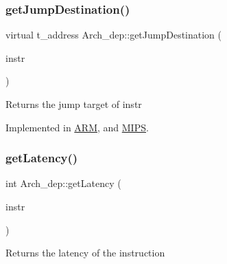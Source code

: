 \subsubsection{\texorpdfstring{get\+Jump\+Destination()}{getJumpDestination()}}
{\footnotesize\ttfamily virtual t\+\_\+address Arch\+\_\+dep\+::get\+Jump\+Destination (\begin{DoxyParamCaption}\item[{const \hyperlink{classObjdumpInstruction}{Objdump\+Instruction} \&}]{instr }\end{DoxyParamCaption})\hspace{0.3cm}{\ttfamily [pure virtual]}}

Returns the jump target of instr 

Implemented in \hyperlink{classARM_ae889878d4d427bda74ca75645ca0f35a}{A\+RM}, and \hyperlink{classMIPS_a64b2312c1817faef2ca139497ffa7ec9}{M\+I\+PS}.

\mbox{\label{classArch__dep_a0b52e67e71b9108513e68020f0f741b7}} 
\subsubsection{\texorpdfstring{get\+Latency()}{getLatency()}}
{\footnotesize\ttfamily int Arch\+\_\+dep\+::get\+Latency (\begin{DoxyParamCaption}\item[{const string \&}]{instr }\end{DoxyParamCaption})}

Returns the latency of the instruction \mbox{\label{classArch__dep_a18db69d3e03bcfbcf5b7d3b36b4f409c}} 

